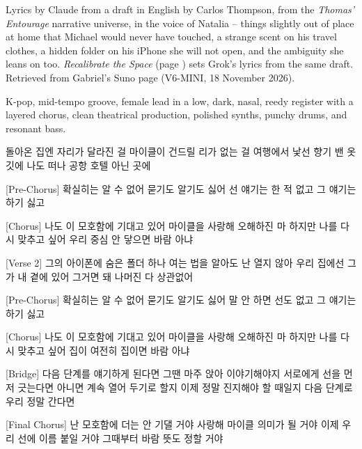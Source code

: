 \label{sec:blurry-line}
\begin{notes}
Lyrics by Claude from a draft in English by Carlos Thompson, from the \emph{Thomas' Entourage} narrative universe, in the voice of Natalia -- things slightly out of place at home that Michael would never have touched, a strange scent on his travel clothes, a hidden folder on his iPhone she will not open, and the ambiguity she leans on too. \emph{Recalibrate the Space} (page \pageref{sec:recalibrate-the-space}) sets Grok's lyrics from the same draft. Retrieved from Gabriel's Suno page (V6-MINI, 18 November 2026).
\end{notes}
\begin{style}
K-pop, mid-tempo groove, female lead in a low, dark, nasal, reedy register with a layered chorus, clean theatrical production, polished synths, punchy drums, and resonant bass.
\end{style}
\begin{lyrics}
[Verse 1]
돌아온 집엔 자리가 달라진 걸
마이클이 건드릴 리가 없는 걸
여행에서 낯선 향기 밴 옷깃에
나도 떠나 공항 호텔 아닌 곳에

[Pre-Chorus]
확실히는 알 수 없어
묻기도 알기도 싫어
선 얘기는 한 적 없고
그 얘기는 하기 싫고

[Chorus]
나도 이 모호함에 기대고 있어
마이클을 사랑해 오해하진 마
하지만 나를 다시 맞추고 싶어
우리 중심 안 닿으면 바람 아냐

[Verse 2]
그의 아이폰에 숨은 폴더 하나
여는 법을 알아도 난 열지 않아
우리 집에선 그가 내 곁에 있어
그거면 돼 나머진 다 상관없어

[Pre-Chorus]
확실히는 알 수 없어
묻기도 알기도 싫어
말 안 하면 선도 없고
그 얘기는 하기 싫고

[Chorus]
나도 이 모호함에 기대고 있어
마이클을 사랑해 오해하진 마
하지만 나를 다시 맞추고 싶어
집이 여전히 집이면 바람 아냐

[Bridge]
다음 단계를 얘기하게 된다면
그땐 마주 앉아 이야기해야지
서로에게 선을 먼저 긋는다면
아니면 계속 열어 두기로 할지
이제 정말 진지해야 할 때일지
다음 단계로 우리 정말 간다면

[Final Chorus]
난 모호함에 더는 안 기댈 거야
사랑해 마이클 의미가 될 거야
이제 우리 선에 이름 붙일 거야
그때부터 바람 뜻도 정할 거야
\end{lyrics}

